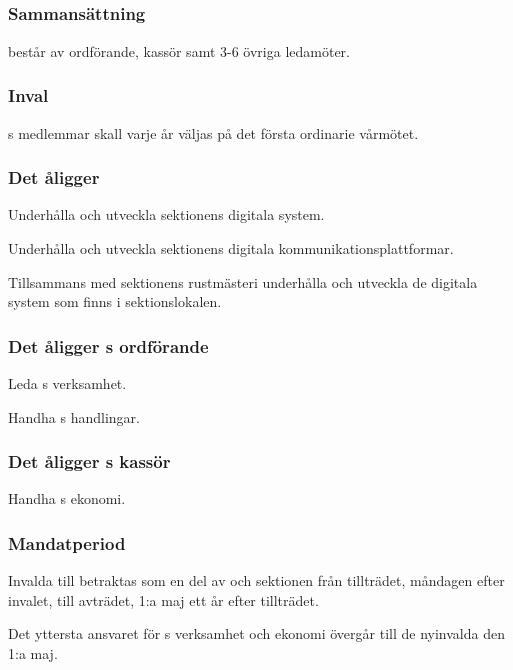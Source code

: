 \subsection{\DIGITFULL}
\subsubsection{Sammansättning}
\DIGIT{} består av ordförande, kassör samt 3-6 övriga ledamöter.

\subsubsection{Inval}
\DIGIT{}s medlemmar skall varje år väljas på det första ordinarie vårmötet.

\subsubsection{Det åligger \DIGIT}
\begin{att}
	\item Underhålla och utveckla sektionens digitala system.
	\item Underhålla och utveckla sektionens digitala kommunikationsplattformar.
	\item Tillsammans med sektionens rustmästeri underhålla och utveckla de digitala system som finns i sektionslokalen.
\end{att}

\subsubsection{Det åligger \DIGIT{}s ordförande}
\begin{att}
	\item Leda \DIGIT{}s verksamhet.
	\item Handha \DIGIT{}s handlingar.
\end{att}

\subsubsection{Det åligger \DIGIT{}s kassör}
\begin{att}
	\item Handha \DIGIT{}s ekonomi.
\end{att}

\subsubsection{Mandatperiod}
Invalda till \DIGIT{} betraktas som en del av \DIGIT{} och sektionen från tillträdet, måndagen efter invalet, till avträdet, 1:a maj ett år efter tillträdet.

Det yttersta ansvaret för \DIGIT{}s verksamhet och ekonomi övergår till de nyinvalda den 1:a maj.


